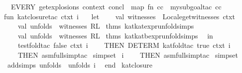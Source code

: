 \begin{isabellebody}
\ \ EVERY\ {}get{}explosions\ context\ concl\ {}{}\ map\ {}fn\ cc\ {}{}\ my{}subgoal{}tac\ cc\ {}{}{}{}\isanewline
\isanewline
fun\ kat{}closure{}tac\ ctxt\ i\ {}\isanewline
\ \ let\isanewline
\ \ \ \ val\ witnesses\ {}\ Locale{}get{}witnesses\ ctxt\isanewline
\ \ \ \ val\ unfolds{}\ {}\ witnesses\ RL\ %
\isaantiq
thms\ kat{}kat{}expr{}unfold{}simps{}%
\endisaantiq
\isanewline
\ \ \ \ val\ unfolds{}\ {}\ witnesses\ RL\ %
\isaantiq
thms\ kat{}kat{}bexpr{}unfold{}simps{}%
\endisaantiq
\isanewline
\ \ in\isanewline
\ \ \ \ test{}fold{}tac\ false\ ctxt\ i\isanewline
\ \ \ \ THEN\ DETERM\ {}kat{}fold{}tac\ true\ ctxt\ i{}\isanewline
\ \ \ \ THEN\ asm{}full{}simp{}tac\ %
\isaantiq
simpset{}%
\endisaantiq
\ i\isanewline
\ \ \ \ THEN\ asm{}full{}simp{}tac\ {}%
\isaantiq
simpset{}%
\endisaantiq
\ addsimps\ unfolds{}\ {}\ unfolds{}{}\ i\isanewline
\ \ end\isanewline
\isanewline
{}\isanewline
\isanewline
{}\isamarkupfalse%
\ kat{}closure\ {}\ {}\isanewline

\end{isabellebody}

